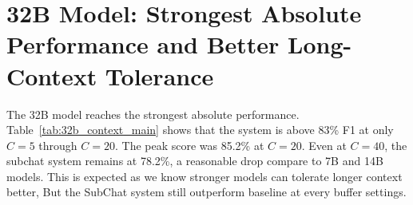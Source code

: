 \section{32B Model: Strongest Absolute Performance and Better Long-Context Tolerance}\label{subsec:results_32b}







The 32B model reaches the strongest absolute performance. Table~\ref{tab:32b_context_main} shows that the system is above 83\% F1 at only $C=5$ through $C=20$. The peak score was 85.2\% at $C=20$. Even at $C=40$, the subchat system remains at 78.2\%, a reasonable drop compare to 7B and 14B models. This is expected as we know stronger models can tolerate longer context better, But the SubChat system still outperform baseline at every buffer settings.








